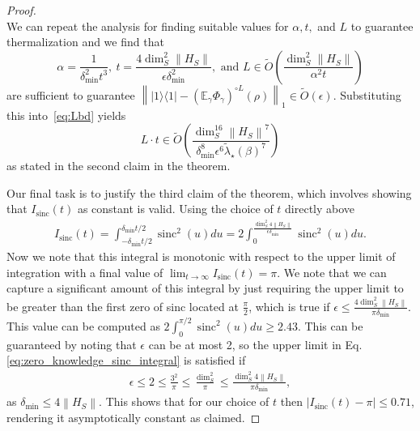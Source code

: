\documentclass[
 amsmath,amssymb,
 aps,
onecolumn, 
nofootinbib]{revtex4-2}
\newcommand{\ketbra}[2]{| #1\rangle\! \langle #2|}
\newcommand{\norm}[1]{\left\| #1 \right\|}
\newcommand{\EE}{\mathbb{E}}
\newcommand{\bigotilde}[1]{\widetilde{O} \left( #1 \right)}
\DeclareMathOperator{\sinc}{sinc}
\begin{document}
\begin{proof}
\begin{equation}
    \end{equation}
    We can repeat the analysis for finding suitable values for $\alpha, t, $ and $L$ to guarantee thermalization and we find that 
    \begin{equation}
        \alpha = \frac{1}{ \delta_{\min}^2 t^3}, ~ t = \frac{4 \dim_S^2 \norm{H_S}}{\epsilon \delta_{\min}^2}, \text{ and } L \in \bigotilde{\frac{\dim_S^2 \norm{H_S}}{\alpha^2 t}}
    \end{equation}
    are sufficient to guarantee $\norm{\ketbra{1}{1} - \left( \EE_\gamma \Phi_\gamma\right)^{\circ L} (\rho)}_1 \in \bigotilde{\epsilon}$.  Substituting this into~\eqref{eq:Lbd} yields
    \begin{equation}
        L\cdot t \in \bigotilde{\frac{\dim_S^{16} \norm{H_S}^7}{\delta_{\min}^8 \epsilon^6 \widetilde{\lambda}_\star(\beta)^7}}
    \end{equation}
    as stated in the second claim in the theorem.

    Our final task is to justify the third claim of the theorem, which involves showing that $I_{\sinc}(t)$ as constant is valid. Using the choice of $t$ directly above
    \begin{align}
        I_{\sinc}(t) = \int_{-\delta_{\min} t /2}^{\delta_{\min} t /2}  \sinc^2(u) du = 2 \int_{0}^{ \frac{\dim_S^2 4 \norm{H_S}} {\epsilon \delta_{\min}}} \sinc^2(u) du. \label{eq:zero_knowledge_sinc_integral}
    \end{align}
    Now we note that this integral is monotonic with respect to the upper limit of integration with a final value of $\lim_{t \to \infty} I_{\sinc}(t) = \pi$. We note that we can capture a significant amount of this integral by just requiring the upper limit to be greater than the first zero of sinc located at $\frac{\pi}{2}$, which is true if $\epsilon \le \frac{4 \dim_S^2 \norm{H_S}}{\pi \delta_{\min}}$. This value can be computed as $2 \int_0^{\pi / 2} \sinc^2(u) du \ge 2.43$. This can be guaranteed by noting that $\epsilon$ can be at most 2, so the upper limit in Eq. \eqref{eq:zero_knowledge_sinc_integral} is satisfied if
    \begin{align}
    \epsilon \le 2 \le \frac{3^2}{\pi} \le \frac{\dim_S^2}{\pi} \le \frac{\dim_S^2 4 \norm{H_S}}{\pi \delta_{\min}},
\end{align}
as $\delta_{\min} \le 4 \norm{H_S}$. This shows that for our choice of $t$ then $|I_{\sinc}(t) - \pi| \le 0.71$, rendering it asymptotically constant as claimed.
\end{proof}
\end{document}
